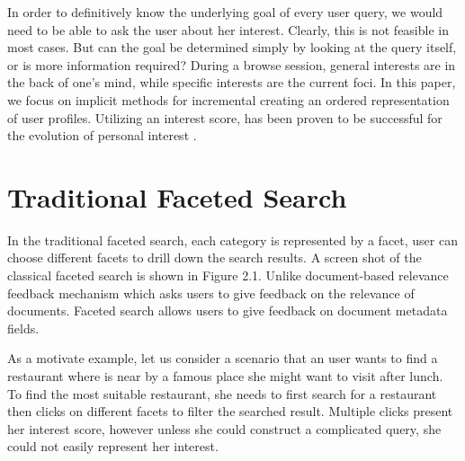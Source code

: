 In order to definitively know the underlying goal of every user query, we would need to be able to ask the user about her interest. Clearly, this is not feasible in most cases\cite{Marchionini2006}. But can the goal be determined simply by looking at the query itself, or is more information required? During a browse session, general interests are in the back of one's mind, while specific interests are the current foci. In this paper, we focus on implicit methods for incremental creating an ordered representation of user profiles. Utilizing an interest score, has been proven to be successful for the evolution of personal interest \cite{Sieg2007}. 

\section{Traditional Faceted Search}

In the traditional faceted search, each category is represented by a facet, user can choose different facets to drill down the search results. A screen shot of the classical faceted search is shown in Figure 2.1. Unlike document-based relevance feedback mechanism which asks users to give feedback on the relevance of documents. Faceted search allows users to give feedback on document metadata fields.

As a motivate example, let us consider a scenario that an user wants to find a restaurant where is near by a famous place she might want to visit after lunch. To find the most suitable restaurant, she needs to first search for a restaurant then clicks on different facets to filter the searched result. Multiple clicks present her interest score, however unless she could construct a complicated query, she could not easily represent her interest.

